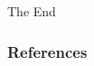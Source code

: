 \documentclass{beamer}
\begin{document}


\begin{frame}
	\Huge{\centerline{The End}}
\end{frame}

\begin{frame}
	\frametitle{References}
	\footnotesize{
		
	}
\end{frame}
\end{document}
